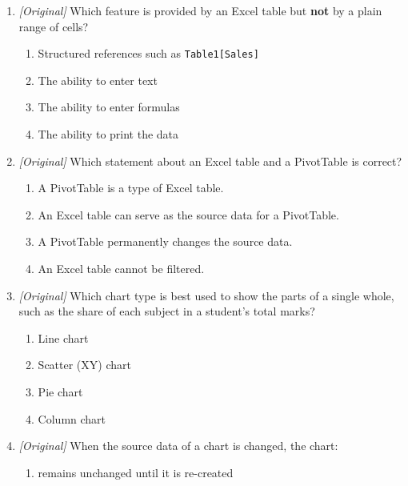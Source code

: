 \begin{enumerate}[label=\textbf{Q\arabic*.}, leftmargin=*]
\begin{enumerate}[label=\Alph*.]
    \item Data can be sorted by more than one level using Add Level.
    \item Data can be sorted by cell colour or font colour.
    \item A custom list can sort by days of the week or months.
    \item Ascending order arranges numbers from largest to smallest.
  \end{enumerate}
\item \textit{[Original]} Which feature is provided by an Excel table but
  \textbf{not} by a plain range of cells?
  \begin{enumerate}[label=\Alph*.]
    \item Structured references such as \texttt{Table1[Sales]}
    \item The ability to enter text
    \item The ability to enter formulas
    \item The ability to print the data
  \end{enumerate}
\item \textit{[Original]} Which statement about an Excel table and a PivotTable
  is correct?
  \begin{enumerate}[label=\Alph*.]
    \item A PivotTable is a type of Excel table.
    \item An Excel table can serve as the source data for a PivotTable.
    \item A PivotTable permanently changes the source data.
    \item An Excel table cannot be filtered.
  \end{enumerate}
\item \textit{[Original]} Which chart type is best used to show the parts of a
  single whole, such as the share of each subject in a student's total marks?
  \begin{enumerate}[label=\Alph*.]
    \item Line chart
    \item Scatter (XY) chart
    \item Pie chart
    \item Column chart
  \end{enumerate}
\item \textit{[Original]} When the source data of a chart is changed, the chart:
  \begin{enumerate}[label=\Alph*.]
    \item remains unchanged until it is re-created

\end{enumerate}
\end{enumerate}
